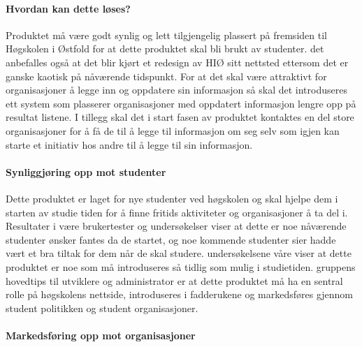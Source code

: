 
\paragraph{Hvordan kan dette løses?}

Produktet må være godt synlig og lett tilgjengelig plassert på fremsiden til Høgskolen i Østfold for at dette produktet skal bli brukt av studenter. det anbefalles også at det blir kjørt et redesign av HIØ sitt nettsted ettersom det er ganske kaotisk på nåværende tidspunkt. For at det skal være attraktivt for organisasjoner å legge inn og oppdatere sin informasjon så skal det introduseres ett system som plasserer organisasjoner med oppdatert informasjon lengre opp på resultat listene. I tillegg skal det i start fasen av produktet kontaktes en del store organisasjoner for å få de til å legge til informasjon om seg selv som igjen kan starte et initiativ hos andre til å legge til sin informasjon. 


\paragraph{Synliggjøring opp mot studenter}

Dette produktet er laget for nye studenter ved høgskolen og skal hjelpe dem i starten av studie tiden for å finne fritids aktiviteter og organisasjoner å ta del i. Resultater i være brukertester og undersøkelser viser at dette er noe nåværende studenter ønsker fantes da de startet, og noe kommende studenter sier hadde vært et bra tiltak for dem når de skal studere. 
undersøkelsene våre viser at dette produktet er noe som må introduseres så tidlig som mulig i studietiden. gruppens hovedtips til utviklere og administrator er at dette produktet må ha en sentral rolle på høgskolens nettside, introduseres i fadderukene og markedsføres gjennom student politikken og student organisasjoner.

\paragraph{Markedsføring opp mot organisasjoner}

